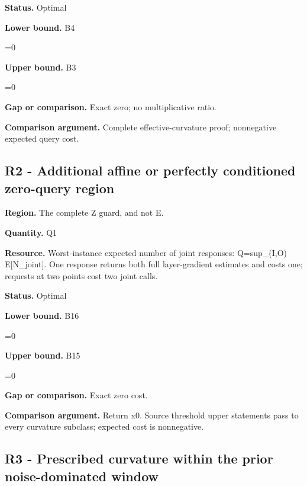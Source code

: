 \documentclass[10pt,a4paper]{article}
\newcommand{\AtlasMath}[1]{\par\begingroup\centering\setbox0=\hbox{$\displaystyle #1$}\ifdim\wd0>1.4\linewidth\typeout{ATLAS WIDE FORMULA: \the\wd0}\fi\ifdim\wd0>\linewidth\resizebox{\linewidth}{!}{\box0}\else\box0\fi\par\endgroup}
\begin{document}
\textbf{Status.} Optimal



\textbf{Lower bound.} B4



\AtlasMath{0}


\textbf{Upper bound.} B3



\AtlasMath{0}


\textbf{Gap or comparison.} Exact zero; no multiplicative ratio.



\textbf{Comparison argument.} Complete effective-curvature proof; nonnegative expected query cost.



\subsection{R2 - Additional affine or perfectly conditioned zero-query region}


\textbf{Region.} The complete Z guard, and not E.



\textbf{Quantity.} Q1



\textbf{Resource.} Worst-instance expected number of joint responses: Q=sup\_(I,O) E[N\_joint]. One response returns both full layer-gradient estimates and costs one; requests at two points cost two joint calls.



\textbf{Status.} Optimal



\textbf{Lower bound.} B16



\AtlasMath{0}


\textbf{Upper bound.} B15



\AtlasMath{0}


\textbf{Gap or comparison.} Exact zero cost.



\textbf{Comparison argument.} Return x0. Source threshold upper statements pass to every curvature subclass; expected cost is nonnegative.



\subsection{R3 - Prescribed curvature within the prior noise-dominated window}
\end{document}
